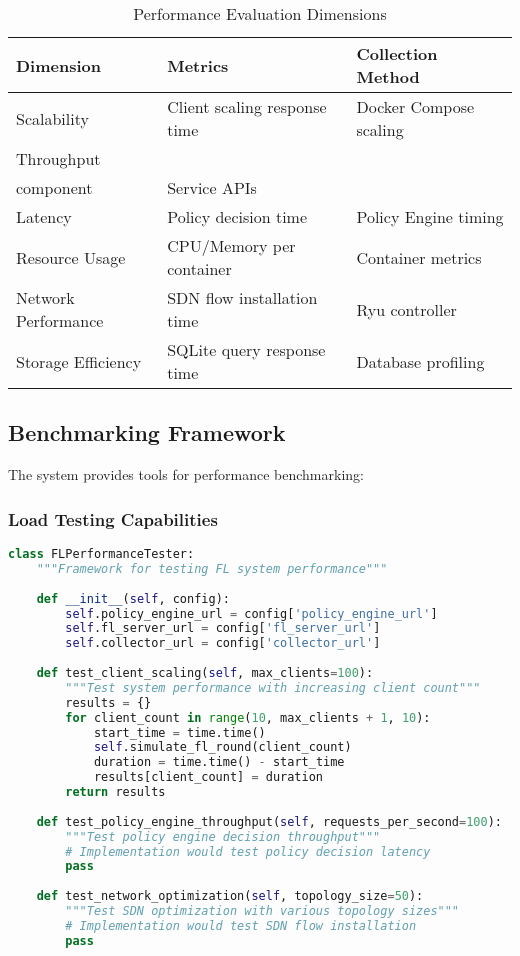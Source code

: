 \begin{table}[H]
\centering
\caption{Performance Evaluation Dimensions}
\label{tab:performance-dimensions}
\begin{tabularx}{\textwidth}{@{}lXX@{}}
\toprule
\textbf{Dimension} & \textbf{Metrics} & \textbf{Collection Method} \\
\midrule
Scalability & Client scaling response time & Docker Compose scaling \\
Throughput & \begin{tabular}{c}Messages/second per\\component\end{tabular} & Service APIs \\
Latency & Policy decision time & Policy Engine timing \\
Resource Usage & CPU/Memory per container & Container metrics \\
Network Performance & SDN flow installation time & Ryu controller \\
Storage Efficiency & SQLite query response time & Database profiling \\
\bottomrule
\end{tabularx}
\end{table}

\subsection{Benchmarking Framework}

The system provides tools for performance benchmarking:

\subsubsection{Load Testing Capabilities}
\begin{lstlisting}[language=python, caption=Performance Testing Framework]
class FLPerformanceTester:
    """Framework for testing FL system performance"""
    
    def __init__(self, config):
        self.policy_engine_url = config['policy_engine_url']
        self.fl_server_url = config['fl_server_url']
        self.collector_url = config['collector_url']
        
    def test_client_scaling(self, max_clients=100):
        """Test system performance with increasing client count"""
        results = {}
        for client_count in range(10, max_clients + 1, 10):
            start_time = time.time()
            self.simulate_fl_round(client_count)
            duration = time.time() - start_time
            results[client_count] = duration
        return results
        
    def test_policy_engine_throughput(self, requests_per_second=100):
        """Test policy engine decision throughput"""
        # Implementation would test policy decision latency
        pass
        
    def test_network_optimization(self, topology_size=50):
        """Test SDN optimization with various topology sizes"""
        # Implementation would test SDN flow installation
        pass
\end{lstlisting}

